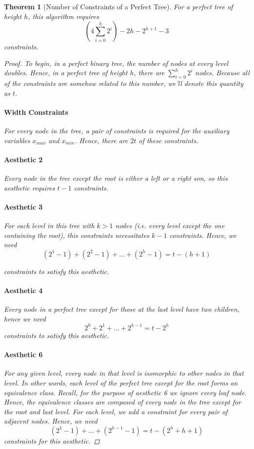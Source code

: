 \documentclass[11pt]{report}
\newtheorem{theorem}{Theorem}[section]
\begin{document}
\begin{theorem}[Number of Constraints of a Perfect Tree]
    For a perfect tree of height $h$, this algorithm requires
    \[ \left( 4\sum_{i=0}^h 2^i \right) - 2h - 2^{h+1} - 3 \]
     constraints.
    
    \begin{proof}
        To begin, in a perfect binary tree, the number of nodes at every level doubles. Hence, in a perfect tree of height $h$, there are 
        $\sum_{i=0}^h 2^i$ nodes. Because all of the constraints are somehow related to this number, we'll denote this quantity as $t$.
        
        \paragraph{Width Constraints} For every node in the tree, a pair of constraints is required for the auxiliary variables $x_{max}$ and $x_{min}$. Hence, there are $2t$ of these constraints.
        
        \paragraph{Aesthetic 2} Every node in the tree except the root is either a left or a right son, so this aesthetic requires $t - 1$ constraints.
        
        \paragraph{Aesthetic 3} For each level in this tree with $k > 1$ nodes (i.e. every level except the one containing the root), this constraints necessitates $k - 1$ constraints. Hence, we need 
        \[
            (2^1 - 1) + (2^2 - 1) + ... + (2^h - 1) = t - (h + 1)
        \]
        
        constraints to satisfy this aesthetic.
        
        \paragraph{Aesthetic 4} Every node in a perfect tree except for those at the last level have two children, hence we need
        \[
            2^0 + 2^1 + ... + 2^{h-1} = t - 2^h
        \]
        constraints to satisfy this aesthetic.
        
        \paragraph{Aesthetic 6} For any given level, every node in that level is isomorphic to other nodes in that level. In other words, each level of the perfect tree except for the root forms an equivalence class. Recall, for the purpose of aesthetic 6 we ignore every leaf node. Hence, the equivalence classes are composed of every node in the tree except for the root and last level. For each level, we add a constraint for every pair of adjacent nodes. Hence, we need
        \[
            (2^1 - 1) + ... + (2^{h - 1} - 1) = t - (2^h + h + 1)
        \]
        constraints for this aesthetic.
        

\end{proof}
\end{theorem}
\end{document}
